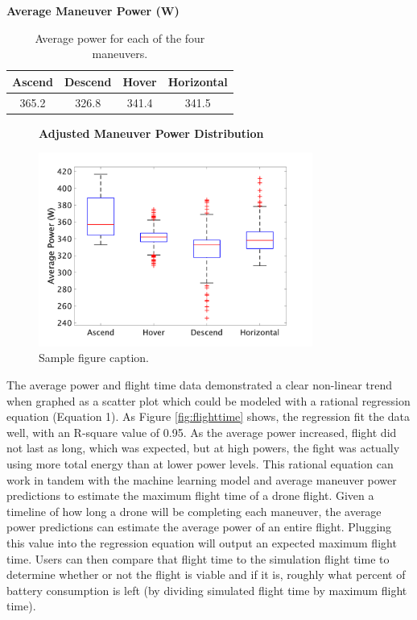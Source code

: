 \documentclass{article}
\begin{document}
\begin{table}[!h]
  \centering
  \large{\textbf{Average Maneuver Power (W)}}\par\medskip
  \begin{tabular}{cccc}
    \toprule
    \cmidrule(r){1-2}
    Ascend     & Descend     & Hover & Horizontal \\
    \midrule
    365.2 & 326.8  & 341.4 & 341.5    \\
    \bottomrule
  \end{tabular} \bigskip
  \caption{Average power for each of the four maneuvers.}
  \label{tab:man}
\end{table}

\begin{figure}[!h]
  \centering
  \large{\textbf{Adjusted Maneuver Power Distribution}}\par
  \includegraphics[width = 90mm]{images/powerfinal.png}
  \caption{Sample figure caption.}
  \label{fig:powerfinal}
\end{figure}





The average power and flight time data demonstrated a clear non-linear trend when graphed as a scatter plot which could be modeled with a rational regression equation (Equation 1). As Figure \ref{fig:flighttime} shows, the regression fit the data well, with an R-square value of 0.95. As the average power increased, flight did not last as long, which was expected, but at high powers, the fight was actually using more total energy than at lower power levels. This rational equation can work in tandem with the machine learning model and average maneuver power predictions to estimate the maximum flight time of a drone flight. Given a timeline of how long a drone will be completing each maneuver, the average power predictions can estimate the average power of an entire flight. Plugging this value into the regression equation will output an expected maximum flight time. Users can then compare that flight time to the simulation flight time to determine whether or not the flight is viable and if it is, roughly what percent of battery consumption is left (by dividing simulated flight time by maximum flight time).
\end{document}
